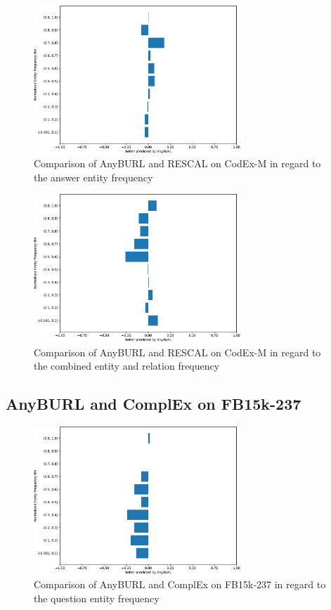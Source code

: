 \begin{figure}[H]
\centering
\includegraphics[width=0.7\textwidth]{images/entity_freq_answer_anyburl_rescal_codex.PNG}
\caption{Comparison of AnyBURL and RESCAL on CodEx-M in regard to the answer entity frequency}
\label{fig:entity_answer_tail_anyburl_rescal_codex}
\end{figure}

\begin{figure}[H]
\centering
\includegraphics[width=0.7\textwidth]{images/combined_freq_anyburl_rescal_codex.PNG}
\caption{Comparison of AnyBURL and RESCAL on CodEx-M in regard to the combined entity and relation frequency}
\label{fig:combined_freq_anyburl_rescal_codex}
\end{figure}


\subsection{AnyBURL and ComplEx on FB15k-237}

\begin{figure}[H]
\centering
\includegraphics[width=0.7\textwidth]{images/entity_freq_question_anyburl_complex_fb15k.PNG}
\caption{Comparison of AnyBURL and ComplEx on FB15k-237 in regard to the question entity frequency}
\label{fig:entity_question_tail_anyburl_complex_fb15k}
\end{figure}


